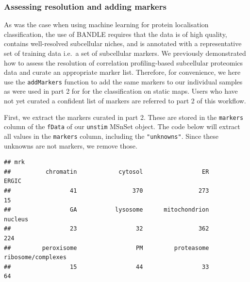 \documentclass[9pt,a4paper,]{extarticle}
\newenvironment{Shaded}{\begin{snugshade}}{\end{snugshade}}
\newcommand{\DocumentationTok}[1]{\textcolor[rgb]{0.56,0.35,0.01}{\textbf{\textit{#1}}}}
\newcommand{\FunctionTok}[1]{\textcolor[rgb]{0.13,0.29,0.53}{\textbf{#1}}}
\newcommand{\NormalTok}[1]{#1}
\newcommand{\OtherTok}[1]{\textcolor[rgb]{0.56,0.35,0.01}{#1}}
\newcommand{\SpecialCharTok}[1]{\textcolor[rgb]{0.81,0.36,0.00}{\textbf{#1}}}
\newcommand{\StringTok}[1]{\textcolor[rgb]{0.31,0.60,0.02}{#1}}
\begin{document}
\subsubsection{Assessing resolution and adding markers}\label{assessing-resolution-and-adding-markers}

As was the case when using machine learning for protein localisation classification,
the use of BANDLE requires that the data is of high quality, contains well-resolved
subcellular niches, and is annotated with a representative set of training data
i.e.~a set of subcellular markers. We previously demonstrated how to assess the
resolution of correlation profiling-based subcellular proteomics data and curate
an appropriate marker list. Therefore, for convenience, we here use the \texttt{addMarkers}
function to add the same markers to our individual samples as were used in part
2 for for the classification on static maps. Users who have not yet curated a
confident list of markers are referred to part 2 of this workflow.

First, we extract the markers curated in part 2. These are stored in the \texttt{markers}
column of the \texttt{fData} of our \texttt{unstim} MSnSet object. The code below will extract
all values in the \texttt{markers} column, including the \texttt{"unknowns"}. Since these
unknowns are not markers, we remove those.

\begin{Shaded}
\end{Shaded}

\begin{verbatim}
## mrk
##          chromatin            cytosol                 ER              ERGIC 
##                 41                370                273                 15 
##                 GA           lysosome      mitochondrion            nucleus 
##                 23                 32                362                224 
##         peroxisome                 PM         proteasome ribosome/complexes 
##                 15                 44                 33                 64
\end{verbatim}
\end{document}
